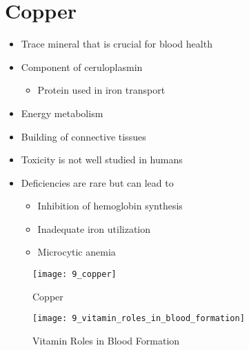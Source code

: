 \documentclass[title={Chapter 9}]{fdsn201notes}
\begin{document}
\section{Copper}\label{sec:Copper}
\begin{itemize}
	\item Trace mineral that is crucial for blood health
	\item Component of ceruloplasmin
	\begin{itemize}
		\item Protein used in iron transport
	\end{itemize}
	\item Energy metabolism
	\item Building of connective tissues
	\item Toxicity is not well studied in humans
	\item Deficiencies are rare but can lead to
	\begin{itemize}
		\item Inhibition of hemoglobin synthesis
		\item Inadequate iron utilization
		\item Microcytic anemia
	\end{itemize}
\end{itemize}

\begin{figure}[H]
	\centering
	\texttt{[image: 9\_copper]}
	\caption{Copper}
	\label{fig:copper}
\end{figure}

\begin{figure}[H]
	\centering
	\texttt{[image: 9\_vitamin\_roles\_in\_blood\_formation]}
	\caption{Vitamin Roles in Blood Formation}
	\label{fig:vitamin-roles-in-blood-formation}
\end{figure}
\end{document}
